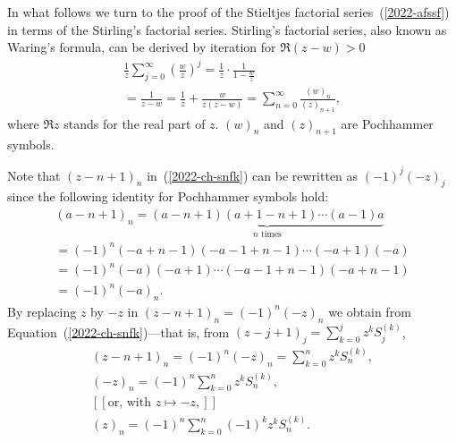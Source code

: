 {\color{OliveGreen}
\bproof

In what follows we turn to the proof of the Stieltjes factorial series~(\ref{2022-afssf}) in terms of the  Stirling's factorial series.
Stirling's factorial series,
also known as Waring's formula,
can be derived by iteration for $\Re (z - w) > 0$
\begin{equation}
\begin{split}
\frac{1}{z} \sum_{j=0}^\infty \left( \frac{w}{z} \right)^j=
\frac{1}{z}\cdot \frac{1}{1-\frac{w}{z}}  \\
=\frac{1}{z-w} =
\frac{1}{z} + \frac{w}{z(z-w)}=
\sum_{n=0}^\infty  \frac{(w)_n}{(z)_{n+1}}
,
\end{split}
\label{2022-m-ch-dswaring}
\end{equation}
where $\Re z$ stands for the real part of $z$.
$(w)_n$ and $(z)_{n+1}$ are Pochhammer symbols.

Note that $(z-n+1)_n$ in~(\ref{2022-ch-snfk}) can be rewritten as  $(-1)^j  (-z)_j$
since the following identity for Pochhammer symbols hold:
\begin{equation}
\begin{split}
(a-n+1)_n = \underbrace{(a-n+1)(a+1-n+1) \cdots (a-1)a}_{n\text{ times}} \\
= (-1)^n (-a+n-1)(-a-1+n-1) \cdots (-a+1)(-a)  \\
= (-1)^n  (-a)(-a+1) \cdots (-a-1+n-1)(-a+n-1) \\
= (-1)^n  (-a)_n
.
\end{split}
\label{2022-m-ch-dsifps}
\end{equation}
By replacing $z$ by $-z$ in  $(z-n+1)_n=(-1)^n  (-z)_n$  we obtain from
Equation~(\ref{2022-ch-snfk})---that is, from
$(z-j+1)_j = \sum_{k=0}^j z^k  {S}_j^{(k)}$,
\begin{equation}
\begin{split}
(z-n+1)_n = (-1)^n  (-z)_n  = \sum_{k=0}^n z^k  {S}_n^{(k)},
\\
(-z)_n  = (-1)^n  \sum_{k=0}^n z^k  {S}_n^{(k)}
,
\\
[[\text{or, with } z \mapsto -z, ]]
\\
(z)_n = (-1)^n  \sum_{k=0}^n (-1)^k  z^k {S}_n^{(k)}
.
\end{split}
\label{2022-m-ch-dsifps22}
\end{equation}

}
